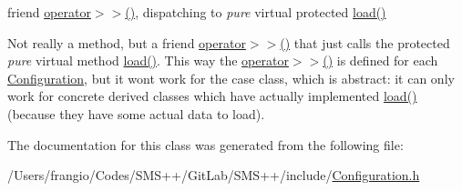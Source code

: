 friend \mbox{\hyperlink{class_s_m_spp__di__unipi__it_1_1_configuration_a670faf8496c014b1c605559fca07429b}{operator$>$$>$()}}, dispatching to {\itshape pure} virtual protected \mbox{\hyperlink{class_s_m_spp__di__unipi__it_1_1_configuration_a27ae9e4279482d52342c7958c34a43c6}{load()}} 

Not really a method, but a friend \mbox{\hyperlink{class_s_m_spp__di__unipi__it_1_1_configuration_a670faf8496c014b1c605559fca07429b}{operator$>$$>$()}} that just calls the protected {\itshape pure} virtual method \mbox{\hyperlink{class_s_m_spp__di__unipi__it_1_1_configuration_a27ae9e4279482d52342c7958c34a43c6}{load()}}. This way the \mbox{\hyperlink{class_s_m_spp__di__unipi__it_1_1_configuration_a670faf8496c014b1c605559fca07429b}{operator$>$$>$()}} is defined for each \mbox{\hyperlink{class_s_m_spp__di__unipi__it_1_1_configuration}{Configuration}}, but it won\textquotesingle{}t work for the case class, which is abstract\+: it can only work for concrete derived classes which have actually implemented \mbox{\hyperlink{class_s_m_spp__di__unipi__it_1_1_configuration_a27ae9e4279482d52342c7958c34a43c6}{load()}} (because they have some actual data to load). 

The documentation for this class was generated from the following file\+:\begin{DoxyCompactItemize}
\item 
/\+Users/frangio/\+Codes/\+S\+M\+S++/\+Git\+Lab/\+S\+M\+S++/include/\mbox{\hyperlink{_configuration_8h}{Configuration.\+h}}\end{DoxyCompactItemize}
